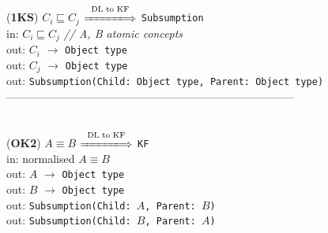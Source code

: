 \documentclass[sn-mathphys]{sn-jnl}
\begin{document}
{{{{\noindent ({\bf 1KS}) {$C_i \sqsubseteq C_j$} $\overset{\text{DL to KF}}{\xLongrightarrow{\hspace*{1.4cm}}}$ {\tt Subsumption}\\
\hspace*{0.3cm}in:  $C_i \sqsubseteq C_j$ \hfill {\it // A, B atomic concepts }\\
\hspace*{0.5cm}out: $C_i$ $\rightarrow$ {\tt Object type }\\
\hspace*{0.5cm}out: $C_j$ $\rightarrow$ {\tt Object type}\\
\hspace*{0.5cm}out:  {\tt Subsumption(Child: Object type, Parent: Object type)} \hfill \\



------------------------------------------------------------------------------
\\ \

\noindent ({\bf OK2}) {$A \equiv B$} $\overset{\text{DL to KF}}{\xLongrightarrow{\hspace*{1.4cm}}}$ {\tt KF}\\
\hspace*{0.3cm}in:  normalised $A \equiv B$ \hfill \\
\hspace*{0.5cm}out: $A$ $\rightarrow$ {\tt Object type }\\
\hspace*{0.5cm}out:  $B$ $\rightarrow$ {\tt Object type}\\
\hspace*{0.5cm}out:  {\tt Subsumption(Child: $A$, Parent: $B$)} \hfill \\
\hspace*{0.5cm}out:  {\tt Subsumption(Child: $B$, Parent: $A$)} \hfill \\






}}}}
\end{document}
